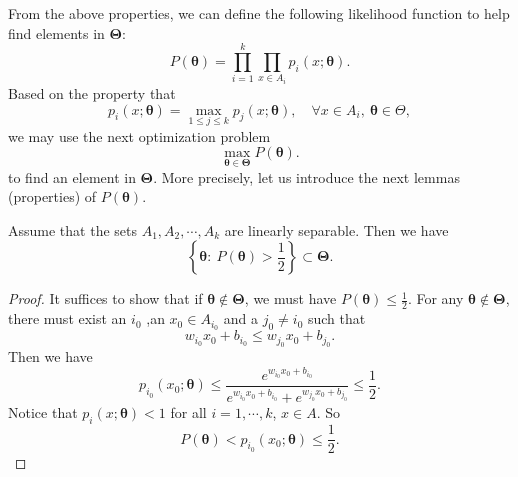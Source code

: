 From the above properties, we can define the following likelihood function to help find elements in $\bm{\Theta}$:
\begin{equation}
P (\bm\theta)=
\prod\limits_{i = 1}^k \prod\limits_{x\in A_i} p_i(x; \bm\theta).
\end{equation} 
Based on the property that
\begin{equation}\label{key}
p_i (x; \bm \theta) = \max_{1\le j \le k} p_j(x; \bm \theta), \quad\forall x \in A_i,\ \bm \theta \in \Theta,
\end{equation}
we may use the next optimization problem
\begin{equation}\label{key}
\max_{\bm \theta\in \bm{\Theta}} P(\bm \theta).
\end{equation}
to find an element in $\bm{\Theta}$. 
More precisely, let us introduce the next lemmas (properties) of $P(\bm \theta)$.
\begin{lemma}\label{lemm:H1/2}
	Assume that the sets $A_1,A_2,\cdots,A_k$ are linearly separable. Then we have
	\begin{equation}
	\left\{\bm \theta:~P(\bm\theta)>\frac{1}{2}\right\}\subset \bm{\Theta}.
	\end{equation}
\end{lemma}
\begin{proof}
	It suffices to show that if $\bm\theta \not\in \bm\Theta$, we must have $P(\bm\theta)\leq\frac{1}{2}$.
	For any $\bm\theta \not\in
	\bm\Theta$, there must exist an $i_0$ ,an $x_0\in A_{i_0}$ and a
	$j_0\neq i_0$ such that
	\begin{equation}
	w_{i_0} x_0 + b_{i_0} \leq w_{j_0}x_0 + b_{j_0}.
	\end{equation}
	Then we have
	\begin{equation}
	p_{i_0}(x_0; \bm\theta) \leq \frac{e^{w_{i_0} x_0 + b_{i_0}}}{e^{w_{i_0} x_0+b_{i_0}}+e^{w_{j_0} x_0+b_{j_0}}} \leq\frac{1}{2}.
	\end{equation}
	Notice that $p_i(x; \bm \theta) < 1$ for all $i = 1,\cdots,k$, $x\in A$.
	So
	\begin{equation}
	P(\bm\theta) <  p_{i_0}(x_0; \bm\theta) \leq \frac{1}{2}.
	\end{equation}
\end{proof}

